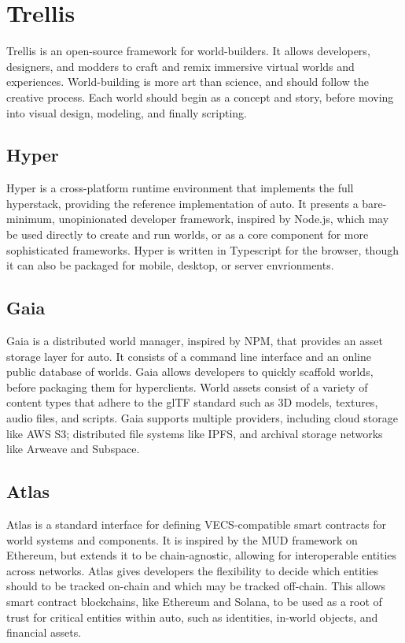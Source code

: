 \documentclass[twocolumn, 10pt]{article}
\begin{document}
\section{Trellis}
Trellis is an open-source framework for world-builders. It allows developers, designers, and modders to craft and remix immersive virtual worlds and experiences. World-building is more art than science, and should follow the creative process. Each world should begin as a concept and story, before moving into visual design, modeling, and finally scripting.

\subsection{Hyper}
Hyper is a cross-platform runtime environment that implements the full hyperstack, providing the reference implementation of auto. It presents a bare-minimum, unopinionated developer framework, inspired by Node.js, which may be used directly to create and run worlds, or as a core component for more sophisticated frameworks. Hyper is written in Typescript for the browser, though it can also be packaged for mobile, desktop, or server envrionments.

\subsection{Gaia}
Gaia is a distributed world manager, inspired by NPM, that provides an asset storage layer for auto. It consists of a command line interface and an online public database of worlds. Gaia allows developers to quickly scaffold worlds, before packaging them for hyperclients. World assets consist of a variety of content types that adhere to the glTF standard such as 3D models, textures, audio files, and scripts. Gaia supports multiple providers, including cloud storage like AWS S3; distributed file systems like IPFS, and archival storage networks like Arweave and Subspace.

\subsection{Atlas}
Atlas is a standard interface for defining VECS-compatible smart contracts for world systems and components. It is inspired by the MUD framework on Ethereum, but extends it to be chain-agnostic, allowing for interoperable entities across networks. Atlas gives developers the flexibility to decide which entities should to be tracked on-chain and which may be tracked off-chain. This allows smart contract blockchains, like Ethereum and Solana, to be used as a root of trust for critical entities within auto, such as identities, in-world objects, and financial assets.
\end{document}
